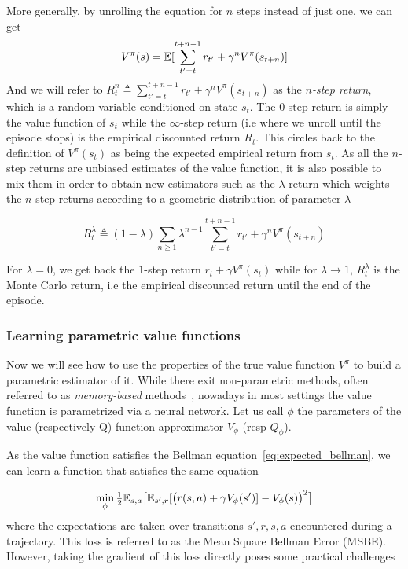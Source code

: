 More generally, by unrolling the equation for $n$ steps instead of just one, we can get
\begin{equation}
      V^\pi(s)  = \mathbb{E} [\sum_{t'=t}^{t+n-1} r_{t'} + \gamma^n V^\pi(s_{t+n})]
\end{equation}
And we will refer to $R^{n}_t \triangleq \sum_{t'=t}^{t+n-1} r_{t'} + \gamma^n V^\pi(s_{t+n})$ as the \emph{$n$-step return}, which is a random variable conditioned on state $s_t$. The $0$-step return is simply the value function of $s_t$ while the $\infty$-step return (i.e where we unroll until the episode stops) is the empirical discounted return $R_t$. This circles back to the definition of $V^\pi(s_t)$ as being the expected empirical return from $s_t$. As all the $n$-step returns are unbiased estimates of the value function, it is also possible to mix them in order to obtain new estimators such as the $\lambda$-return which weights the $n$-step returns according to a geometric distribution of parameter $\lambda$

\begin{equation}
\label{eq:lambda_return}
    R^\lambda_t \triangleq (1-\lambda) \sum_{n \ge 1} \lambda^{n-1} \sum_{t'=t}^{t+n-1} r_{t'} + \gamma^n V^\pi(s_{t+n})
\end{equation}

For $\lambda=0$, we get back the $1$-step return $r_t + \gamma V^\pi(s_t)$ while for $\lambda \to 1$, $R^\lambda_t$ is the Monte Carlo return, i.e the empirical discounted return until the end of the episode.


\subsubsection{Learning parametric value functions}
\label{subsec:td}

Now we will see how to use the properties of the true value function $V^\pi$ to build a parametric estimator of it. While there exit non-parametric methods, often referred to as \emph{memory-based} methods~\citep{atkeson1997locally}, nowadays in most settings the value function is parametrized via a neural network. Let us call $\phi$ the parameters of the value (respectively Q) function approximator $V_\phi$ (resp $Q_\phi$).

As the value function satisfies the Bellman equation~\cref{eq:expected_bellman}, we can learn a function that satisfies the same equation

\begin{equation}
\label{eq:MSBE}
    \min_\phi \tfrac{1}{2} \mathbb{E}_{s, a} \big[ \mathbb{E}_{s', r}[ \big( r(s,a) + \gamma V_\phi(s')] - V_\phi(s) \big)^2\big]
\end{equation}
where the expectations are taken over transitions $s', r, s, a$ encountered during a trajectory. This loss is referred to as the Mean Square Bellman Error (MSBE). %
However, taking the gradient of this loss directly poses some practical challenges

